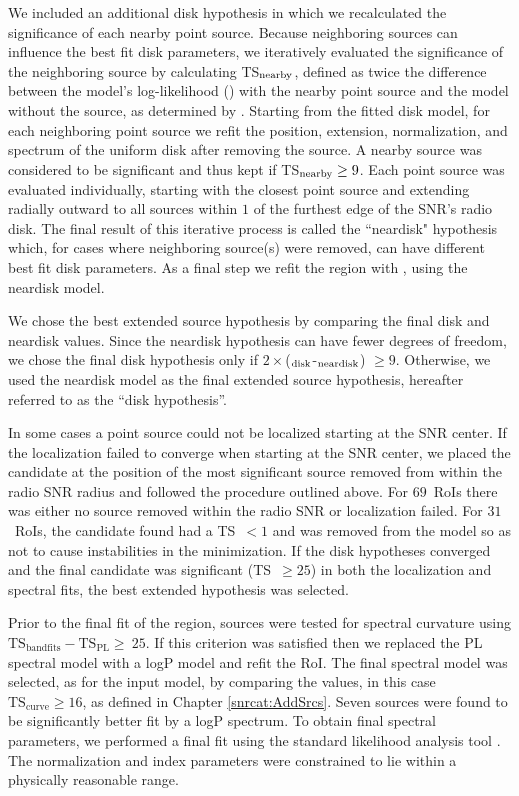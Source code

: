 We included an additional disk hypothesis in which we recalculated the significance of each nearby point source. Because neighboring sources can influence the best fit disk parameters, we iteratively evaluated the significance of the neighboring source by calculating TS$_{\rm nearby}$, defined as twice the difference between the model's log-likelihood (\logL{}) with the nearby point source and the model without the source, as determined by \ptlike. Starting from the fitted disk model, for each neighboring point source we refit the position, extension, normalization, and spectrum of the uniform disk after removing the source. A nearby source was considered to be significant and thus kept if TS$_{\rm nearby} \geq 9$. Each point source was evaluated individually, starting with the closest point source and extending radially outward to all sources within $1$\degr{} of the furthest edge of the SNR's radio disk. The final result of this iterative process is called the ``neardisk" hypothesis which, for cases where neighboring source(s) were removed, can have different best fit disk parameters. As a final step we refit the region with \gtlike, using the neardisk model.

We chose the best extended source hypothesis by comparing the final disk and neardisk \gtlike{} \logL{} values. Since the neardisk hypothesis can have fewer degrees of freedom, we chose the final disk hypothesis only if $2\times$(\logL{}$_{\rm disk}$-\logL{}$_{\rm neardisk}$) $\geq 9$. Otherwise, we used the neardisk model as the final extended source hypothesis, hereafter referred to as the ``disk hypothesis''.

In some cases a point source could not be localized starting at the SNR center. If the \ptlike{} localization failed to converge when starting at the SNR center, we placed the candidate at the position of the most significant source removed from within the radio SNR radius and followed the procedure outlined above. For $69$~RoIs there was either no source removed within the radio SNR or localization failed. For $31$~RoIs, the candidate found had a TS~$<1$ and was removed from the model so as not to cause instabilities in the minimization. If the disk hypotheses converged and the final candidate was significant (TS~$\geq 25$) in both the localization and spectral fits, the best extended hypothesis was selected. 

Prior to the final fit of the region, sources were tested for spectral curvature using $\mathrm{TS_{band fits} - TS_{PL}}\geq~25$. If this criterion was satisfied then we replaced the PL spectral model with a logP model and refit the RoI. The final spectral model was selected, as for the input model, by comparing the \logL{} values, in this case $\mathrm{TS_{curve}} \geq 16$, as defined in Chapter \ref{snrcat:AddSrcs}. Seven sources were found to be significantly better fit by a logP spectrum. To obtain final spectral parameters, we performed a final fit using the standard likelihood analysis tool \gtlike. The normalization and index parameters were constrained to lie within a physically reasonable range. 

